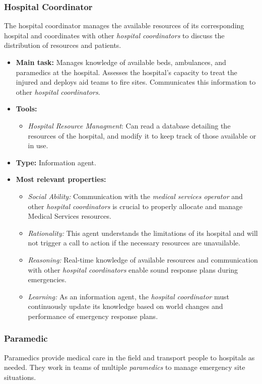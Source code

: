 \subsubsection{Hospital Coordinator}
The hospital coordinator manages the available resources of its corresponding hospital and coordinates with other \textit{hospital coordinators} to discuss the distribution of resources and patients.

\begin{itemize}
    \item \textbf{Main task:} Manages knowledge of available beds, ambulances, and paramedics at the hospital. Assesses the hospital's capacity to treat the injured and deploys aid teams to fire sites. Communicates this information to other \textit{hospital coordinators}.
    \item \textbf{Tools:}
    \begin{itemize}
        \item \textit{Hospital Resource Managment}: Can read a database detailing the resources of the hospital, and modify it to keep track of those available or in use.
    \end{itemize}
    \item \textbf{Type:} Information agent.
    \item \textbf{Most relevant properties:}
    \begin{itemize}
        \item \textit{Social Ability:} Communication with the \textit{medical services operator} and other \textit{hospital coordinators} is crucial to properly allocate and manage Medical Services resources.
        \item \textit{Rationality:} This agent understands the limitations of its hospital and will not trigger a call to action if the necessary resources are unavailable.
        \item \textit{Reasoning:} Real-time knowledge of available resources and communication with other \textit{hospital coordinators} enable sound response plans during emergencies.
        \item \textit{Learning:} As an information agent, the \textit{hospital coordinator} must continuously update its knowledge based on world changes and performance of emergency response plans.
    \end{itemize}
\end{itemize}

\subsubsection{Paramedic}
Paramedics provide medical care in the field and transport people to hospitals as needed. They work in teams of multiple \textit{paramedics} to manage emergency site situations.

